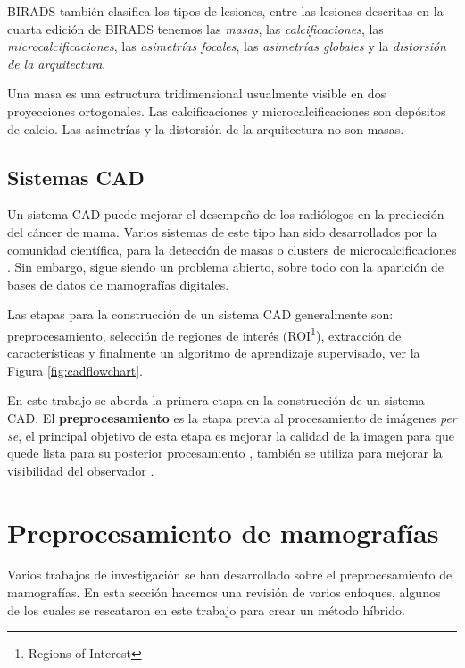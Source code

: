 BIRADS también clasifica los tipos de lesiones, entre las lesiones descritas en
la cuarta edición de BIRADS tenemos las \textit{masas}, las
\textit{calcificaciones}, las \textit{microcalcificaciones}, las
\textit{asimetrías focales}, las \textit{asimetrías globales} y la
\textit{distorsión de la arquitectura}. 

Una masa es una estructura tridimensional usualmente visible en dos
proyecciones ortogonales. Las calcificaciones y microcalcificaciones son
depósitos de calcio. Las asimetrías y la distorsión de la arquitectura no son
masas.

\subsection{Sistemas CAD}

Un sistema CAD puede mejorar el desempeño de los radiólogos en la predicción
del cáncer de mama. Varios sistemas de este tipo han sido desarrollados por la
comunidad científica, para la detección de masas \cite{bellotti2006completely}
o clusters de microcalcificaciones \cite{yu2000cad}. Sin embargo, sigue siendo
un problema abierto, sobre todo con la aparición de bases de datos de
mamografías digitales.

Las etapas para la construcción de un sistema CAD generalmente son:
preprocesamiento, selección de regiones de interés (ROI\footnote{Regions of
Interest}), extracción de características y finalmente un algoritmo de
aprendizaje supervisado, ver la Figura \ref{fig:cadflowchart}.

\shorthandoff{>} %
    
\shorthandon{>} 

En este trabajo se aborda la primera etapa en la construcción de un sistema
CAD. El \textbf{preprocesamiento} es la etapa previa al procesamiento de
imágenes \textit{per se}, el principal objetivo de esta etapa es mejorar la
calidad de la imagen para que quede lista para su posterior procesamiento
\cite{ponraj2011survey}, también se utiliza para mejorar la visibilidad del
observador \cite{rahmati2010new}. 

\section{Preprocesamiento de mamografías}

Varios trabajos de investigación se han desarrollado sobre el preprocesamiento
de mamografías. En esta sección hacemos una revisión de varios enfoques,
algunos de los cuales se rescataron en este trabajo para crear un método híbrido.


